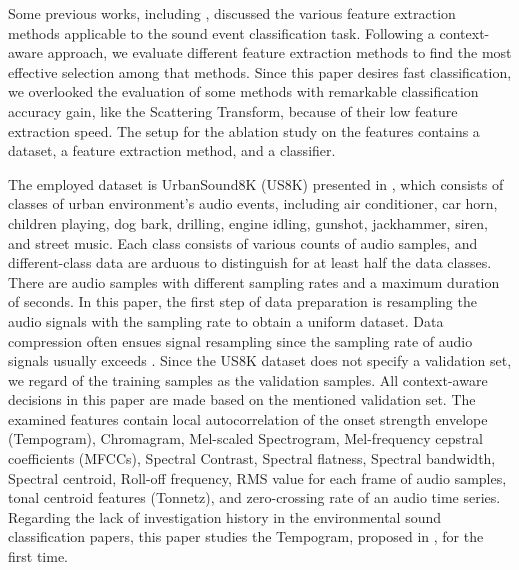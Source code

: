 \documentclass{article}
\begin{document}
Some previous works, including \citep{Song, Theodoros, Su, Li}, discussed the various feature extraction methods applicable to the sound event classification task. Following a context-aware approach, we evaluate different feature extraction methods to find the most effective selection among that methods. Since this paper desires fast classification, we overlooked the evaluation of some methods with remarkable classification accuracy gain, like the Scattering Transform, because of their low feature extraction speed. The setup for the ablation study on the features contains a dataset, a feature extraction method, and a classifier. 

The employed dataset is UrbanSound8K (US8K) presented in \citep{Salamon}, which consists of  classes of urban environment's audio events, including air conditioner, car horn, children playing, dog bark, drilling, engine idling, gunshot, jackhammer, siren, and street music. Each class consists of various counts of audio samples, and different-class data are arduous to distinguish for at least half the data classes. There are  audio samples with different sampling rates and a maximum duration of  seconds. In this paper, the first step of data preparation is resampling the audio signals with the  sampling rate to obtain a uniform dataset. Data compression often ensues signal resampling since the sampling rate of audio signals usually exceeds . Since the US8K dataset does not specify a validation set, we regard  of the training samples as the validation samples. All context-aware decisions in this paper are made based on the mentioned validation set. The examined features contain local autocorrelation of the onset strength envelope (Tempogram), Chromagram, Mel-scaled Spectrogram, Mel-frequency cepstral coefficients (MFCCs), Spectral Contrast, Spectral flatness, Spectral bandwidth, Spectral centroid, Roll-off frequency, RMS value for each frame of audio samples, tonal centroid features (Tonnetz), and zero-crossing rate of an audio time series. Regarding the lack of investigation history in the environmental sound classification papers, this paper studies the Tempogram, proposed in \citep{Grosche}, for the first time. 
\end{document}
